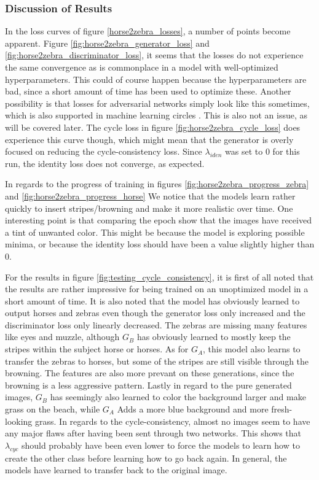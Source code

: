 \documentclass[11pt, fleqn, titlepage]{article}
\newcommand{\1}[1]{\mathds{1}\left[#1\right]}
\begin{document}
\subsubsection{Discussion of Results}
In the loss curves of figure \ref{horse2zebra_losses}, a number of points become apparent. Figure \ref{fig:horse2zebra_generator_loss} and \ref{fig:horse2zebra_discriminator_loss}, it seems that the losses do not experience the same convergence as is commonplace in a model with well-optimized hyperparameters. This could of course happen because the hyperparameters are bad, since a short amount of time has been used to optimize these. Another possibility is that losses for adversarial networks simply look like this sometimes, which is also supported in  machine learning circles \cite{mode_collapse_MLM}. This is also not an issue, as will be covered later. The cycle loss in figure \ref{fig:horse2zebra_cycle_loss} does experience this curve though, which might mean that the generator is overly focused on reducing the cycle-consistency loss. Since $\lambda_{iden}$ was set to $ 0 $ for this run, the identity loss does not converge, as expected.

In regards to the progress of training in figures \ref{fig:horse2zebra_progress_zebra} and \ref{fig:horse2zebra_progress_horse} We notice that the models learn rather quickly to insert stripes/browning and make it more realistic over time. One interesting point is that comparing the epoch show that the images have received a tint of unwanted color. This might be because the model is exploring possible minima, or because the identity loss should have been a value slightly higher than $0$.

For the results in figure \ref{fig:testing_cycle_consistency}, it is first of all noted that the results are rather impressive for being trained on an unoptimized model in a short amount of time. It is also noted that the model has obviously learned to output horses and zebras even though the generator loss only increased and the discriminator loss only linearly decreased. The zebras are missing many features like eyes and muzzle, although $G_B$ has obviously learned to mostly keep the stripes within the subject horse or horses. As for $G_A$, this model also learns to transfer the zebras to horses, but some of the stripes are still visible through the browning. The features are also more prevant on these generations, since the browning is a less aggressive pattern. Lastly in regard to the pure generated images, $G_B$ has seemingly also learned to color the background larger and make grass on the beach, while $G_A$ Adds a more blue background and more fresh-looking grass. In regards to the cycle-consistency, almost no images seem to have any major flaws after having been sent through two networks. This shows that $\lambda_{cyc}$ should probably have been even lower to force the models to learn how to create the other class before learning how to go back again. In general, the models have learned to transfer back to the original image.
\end{document}
